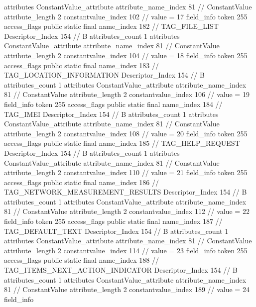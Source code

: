 {{{{{				attributes {
				ConstantValue_attribute {
					attribute_name_index	81		// ConstantValue
					attribute_length	2
					constantvalue_index	102		// value = 17
				}
				}
			}
			field_info {
				token	255
				access_flags	public static final
				name_index	182		// TAG_FILE_LIST
				Descriptor_Index	154		// B
				attributes_count	1
				attributes {
				ConstantValue_attribute {
					attribute_name_index	81		// ConstantValue
					attribute_length	2
					constantvalue_index	104		// value = 18
				}
				}
			}
			field_info {
				token	255
				access_flags	public static final
				name_index	183		// TAG_LOCATION_INFORMATION
				Descriptor_Index	154		// B
				attributes_count	1
				attributes {
				ConstantValue_attribute {
					attribute_name_index	81		// ConstantValue
					attribute_length	2
					constantvalue_index	106		// value = 19
				}
				}
			}
			field_info {
				token	255
				access_flags	public static final
				name_index	184		// TAG_IMEI
				Descriptor_Index	154		// B
				attributes_count	1
				attributes {
				ConstantValue_attribute {
					attribute_name_index	81		// ConstantValue
					attribute_length	2
					constantvalue_index	108		// value = 20
				}
				}
			}
			field_info {
				token	255
				access_flags	public static final
				name_index	185		// TAG_HELP_REQUEST
				Descriptor_Index	154		// B
				attributes_count	1
				attributes {
				ConstantValue_attribute {
					attribute_name_index	81		// ConstantValue
					attribute_length	2
					constantvalue_index	110		// value = 21
				}
				}
			}
			field_info {
				token	255
				access_flags	public static final
				name_index	186		// TAG_NETWORK_MEASUREMENT_RESULTS
				Descriptor_Index	154		// B
				attributes_count	1
				attributes {
				ConstantValue_attribute {
					attribute_name_index	81		// ConstantValue
					attribute_length	2
					constantvalue_index	112		// value = 22
				}
				}
			}
			field_info {
				token	255
				access_flags	public static final
				name_index	187		// TAG_DEFAULT_TEXT
				Descriptor_Index	154		// B
				attributes_count	1
				attributes {
				ConstantValue_attribute {
					attribute_name_index	81		// ConstantValue
					attribute_length	2
					constantvalue_index	114		// value = 23
				}
				}
			}
			field_info {
				token	255
				access_flags	public static final
				name_index	188		// TAG_ITEMS_NEXT_ACTION_INDICATOR
				Descriptor_Index	154		// B
				attributes_count	1
				attributes {
				ConstantValue_attribute {
					attribute_name_index	81		// ConstantValue
					attribute_length	2
					constantvalue_index	189		// value = 24
				}
				}
			}
			field_info {
}}}}}
